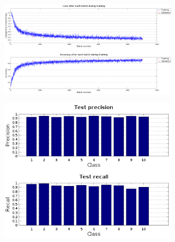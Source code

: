 \begin{figure}
	\centering
	\begin{subfigure}{1\textwidth}
		\centering
		\includegraphics[width=1\linewidth]{figures/learning_curves.png}
		\caption{}
	\end{subfigure}
	\begin{subfigure}{0.5\textwidth}
		\centering
		\includegraphics[width=1\linewidth]{figures/prec_rec.png}
		\caption{}
	\end{subfigure}%
	\begin{subfigure}{0.5\textwidth}
		\centering

\end{subfigure}
\end{figure}

